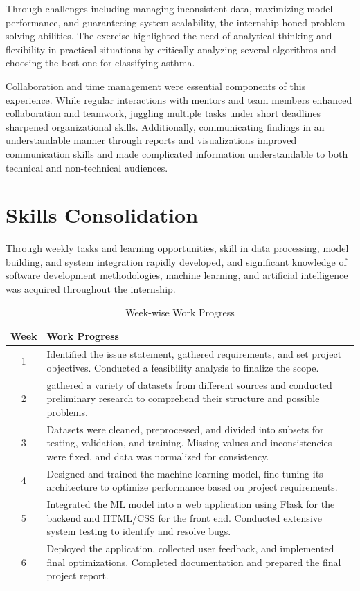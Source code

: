 Through challenges including managing inconsistent data, maximizing model performance, and guaranteeing system scalability, the internship honed problem-solving abilities. The exercise highlighted the need of analytical thinking and flexibility in practical situations by critically analyzing several algorithms and choosing the best one for classifying asthma.

Collaboration and time management were essential components of this experience. While regular interactions with mentors and team members enhanced collaboration and teamwork, juggling multiple tasks under short deadlines sharpened organizational skills. Additionally, communicating findings in an understandable manner through reports and visualizations improved communication skills and made complicated information understandable to both technical and non-technical audiences.
\section{Skills Consolidation}
Through weekly tasks and learning opportunities, skill in data processing, model building, and system integration rapidly developed, and significant knowledge of software development methodologies, machine learning, and artificial intelligence was acquired throughout the internship.
\begin{table}[h]
    \centering
    \caption{Week-wise Work Progress}
    \begin{center}  
        \begin{tabular}{|c|p{12.4cm}|}
            \hline
            \textbf{Week} & \textbf{Work Progress} \\ \hline
            1 &Identified the issue statement, gathered requirements, and set project objectives. Conducted a feasibility analysis to finalize the scope. \\ \hline
            2 & gathered a variety of datasets from different sources and conducted preliminary research to comprehend their structure and possible problems. \\ \hline
            3 & Datasets were cleaned, preprocessed, and divided into subsets for testing, validation, and training. Missing values and inconsistencies were fixed, and data was normalized for consistency. \\ \hline
            4 & Designed and trained the machine learning model, fine-tuning its architecture to optimize performance based on project requirements. \\ \hline
            5 & Integrated the ML model into a web application using Flask for the backend and HTML/CSS for the front end. Conducted extensive system testing to identify and resolve bugs.\\ \hline
            6 & Deployed the application, collected user feedback, and implemented final optimizations. Completed documentation and prepared the final project report. \\ \hline
        \end{tabular}
    \end{center}
    \label{tab:work}
\end{table}
